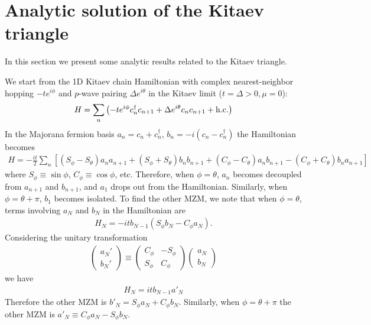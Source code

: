 \section{Analytic solution of the Kitaev triangle}
In this section we present some analytic results related to the Kitaev triangle.

We start from the 1D Kitaev chain Hamiltonian with complex nearest-neighbor hopping $-te^{i\phi}$ and $p$-wave pairing $\Delta e^{i\theta}$ in the Kitaev limit ($t=\Delta > 0, \mu = 0$):
\begin{eqnarray}
	H = \sum_{n}\left(- te^{i\phi}c_n^\dag c_{n+1} + \Delta e^{i\theta}c_nc_{n+1} + {\rm h.c.}\right)
\end{eqnarray}
In the Majorana fermion basis $a_n = c_n + c_n^\dag$, $b_n = -i(c_n - c_n^\dag)$ the Hamiltonian becomes
\begin{eqnarray}
H = -\frac{it}{2} \sum_n \left[(S_\phi - S_\theta) a_n a_{n+1} + (S_\phi + S_\theta)b_n b_{n+1} + (C_\phi - C_\theta) a_n b_{n+1} - (C_\phi + C_\theta)b_na_{n+1}\right]
\end{eqnarray}
where $S_\phi\equiv \sin\phi$, $C_\phi\equiv \cos\phi$, etc. Therefore, when $\phi = \theta$, $a_n$ becomes decoupled from $a_{n+1}$ and $b_{n+1}$, and $a_1$ drops out from the Hamiltonian. Similarly, when $\phi = \theta + \pi$, $b_1$ becomes isolated. To find the other MZM, we note that when $\phi = \theta$, terms involving $a_{N}$ and $b_N$ in the Hamiltonian are
\begin{eqnarray}
	H_N = -itb_{N-1}(S_\phi b_{N} - C_\phi a_N).
\end{eqnarray}
Considering the unitary transformation
\begin{eqnarray}
	\begin{pmatrix}
		a_N' \\
		b_N'
	\end{pmatrix} \equiv\begin{pmatrix}
	C_\phi & - S_\phi\\
	S_\phi & C_\phi
\end{pmatrix}\begin{pmatrix}
a_N\\
b_N
\end{pmatrix}
\end{eqnarray}
we have
\begin{eqnarray}
	H_N = itb_{N-1} a'_N
\end{eqnarray}
Therefore the other MZM is $b'_N = S_\phi a_N + C_\phi b_N$. Similarly, when $\phi = \theta + \pi$ the other MZM is $a'_{N} \equiv C_\phi a_N - S_\phi b_N$.

